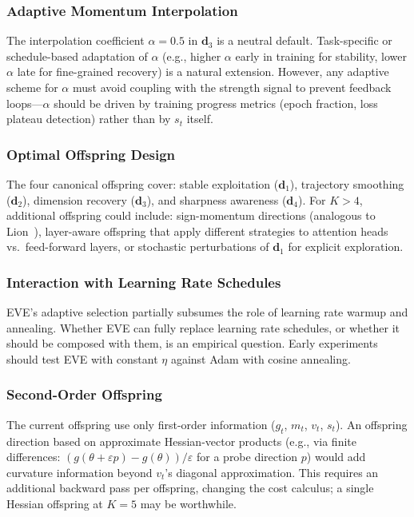 \documentclass[12pt]{article}
\begin{document}
\subsubsection{Adaptive Momentum Interpolation}

The interpolation coefficient $\alpha = 0.5$ in $\mathbf{d}_3$ is
a neutral default.
Task-specific or schedule-based adaptation of $\alpha$ (e.g.,
higher $\alpha$ early in training for stability, lower $\alpha$ late
for fine-grained recovery) is a natural extension.
However, any adaptive scheme for $\alpha$ must avoid coupling with
the strength signal to prevent feedback loops---$\alpha$ should be
driven by training progress metrics (epoch fraction, loss plateau
detection) rather than by $s_t$ itself.

\subsubsection{Optimal Offspring Design}

The four canonical offspring cover: stable exploitation ($\mathbf{d}_1$),
trajectory smoothing ($\mathbf{d}_2$), dimension recovery
($\mathbf{d}_3$), and sharpness awareness ($\mathbf{d}_4$).
For $K > 4$, additional offspring could include:
sign-momentum directions (analogous to Lion~\cite{chen2024lion}),
layer-aware offspring that apply different strategies to attention
heads vs.\ feed-forward layers, or stochastic perturbations of
$\mathbf{d}_1$ for explicit exploration.

\subsubsection{Interaction with Learning Rate Schedules}

EVE's adaptive selection partially subsumes the role of learning rate
warmup and annealing.
Whether EVE can fully replace learning rate schedules, or whether it
should be composed with them, is an empirical question.
Early experiments should test EVE with constant $\eta$ against
Adam with cosine annealing.

\subsubsection{Second-Order Offspring}

The current offspring use only first-order information ($g_t$, $m_t$,
$v_t$, $s_t$).
An offspring direction based on approximate Hessian-vector products
(e.g., via finite differences: $(g(\theta + \varepsilon p) - g(\theta))
/ \varepsilon$ for a probe direction $p$) would add curvature
information beyond $v_t$'s diagonal approximation.
This requires an additional backward pass per offspring, changing the
cost calculus; a single Hessian offspring at $K = 5$ may be worthwhile.
\end{document}
